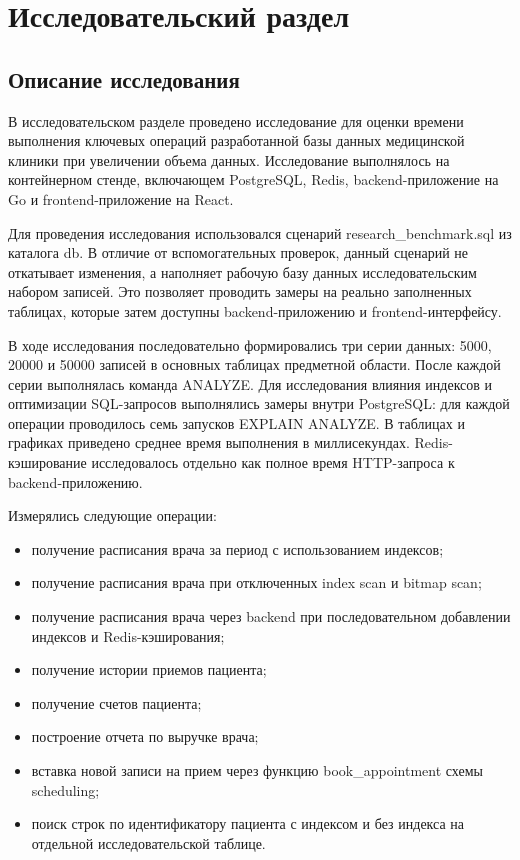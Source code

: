 \chapter{Исследовательский раздел}

\section{Описание исследования}

В исследовательском разделе проведено исследование для оценки времени выполнения ключевых операций разработанной базы данных медицинской клиники при увеличении объема данных. Исследование выполнялось на контейнерном стенде, включающем PostgreSQL, Redis, backend-приложение на Go и frontend-приложение на React.

Для проведения исследования использовался сценарий research\_benchmark.sql из каталога db. В отличие от вспомогательных проверок, данный сценарий не откатывает изменения, а наполняет рабочую базу данных исследовательским набором записей. Это позволяет проводить замеры на реально заполненных таблицах, которые затем доступны backend-приложению и frontend-интерфейсу.

В ходе исследования последовательно формировались три серии данных: 5000, 20000 и 50000 записей в основных таблицах предметной области. После каждой серии выполнялась команда ANALYZE. Для исследования влияния индексов и оптимизации SQL-запросов выполнялись замеры внутри PostgreSQL: для каждой операции проводилось семь запусков EXPLAIN ANALYZE. В таблицах и графиках приведено среднее время выполнения в миллисекундах. Redis-кэширование исследовалось отдельно как полное время HTTP-запроса к backend-приложению.

Измерялись следующие операции:
\begin{itemize}
    \item получение расписания врача за период с использованием индексов;
    \item получение расписания врача при отключенных index scan и bitmap scan;
    \item получение расписания врача через backend при последовательном добавлении индексов и Redis-кэширования;
    \item получение истории приемов пациента;
    \item получение счетов пациента;
    \item построение отчета по выручке врача;
    \item вставка новой записи на прием через функцию book\_appointment схемы scheduling;
    \item поиск строк по идентификатору пациента с индексом и без индекса на отдельной исследовательской таблице.
\end{itemize}

